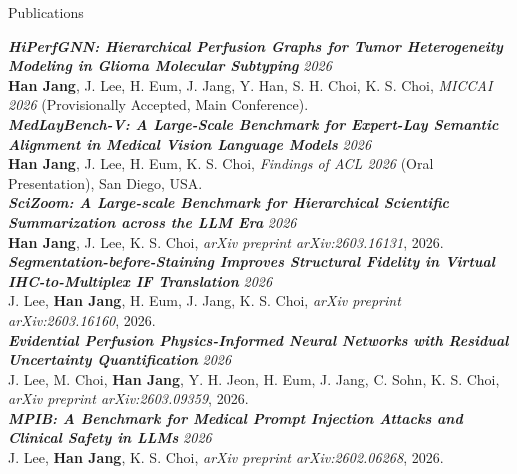 \documentclass{resume}
\begin{document}
\begin{rSection}{Publications}

\textbf{\textit{HiPerfGNN: Hierarchical Perfusion Graphs for Tumor Heterogeneity Modeling in Glioma Molecular Subtyping}}%
\hfill \textit{2026} \\
\hspace*{1em} \textbf{Han Jang}, J. Lee, H. Eum, J. Jang, Y. Han, S. H. Choi, K. S. Choi, \textit{MICCAI 2026} (Provisionally Accepted, Main Conference).
\\[0.8em]

\textbf{\textit{MedLayBench-V: A Large-Scale Benchmark for Expert-Lay Semantic Alignment in Medical Vision Language Models}}%
\hfill \textit{2026} \\
\hspace*{1em} \textbf{Han Jang}, J. Lee, H. Eum, K. S. Choi, \textit{Findings of ACL 2026} (Oral Presentation), San Diego, USA.
\\[0.8em]

\textbf{\textit{SciZoom: A Large-scale Benchmark for Hierarchical Scientific Summarization across the LLM Era}}%
\hfill \textit{2026} \\
\hspace*{1em} \textbf{Han Jang}, J. Lee, K. S. Choi, \textit{arXiv preprint arXiv:2603.16131}, 2026.
\\[0.8em]

\textbf{\textit{Segmentation-before-Staining Improves Structural Fidelity in Virtual IHC-to-Multiplex IF Translation}}%
\hfill \textit{2026} \\
\hspace*{1em} J. Lee, \textbf{Han Jang}, H. Eum, J. Jang, K. S. Choi, \textit{arXiv preprint arXiv:2603.16160}, 2026.
\\[0.8em]

\textbf{\textit{Evidential Perfusion Physics-Informed Neural Networks with Residual Uncertainty Quantification}}%
\hfill \textit{2026} \\
\hspace*{1em} J. Lee, M. Choi, \textbf{Han Jang}, Y. H. Jeon, H. Eum, J. Jang, C. Sohn, K. S. Choi, \textit{arXiv preprint arXiv:2603.09359}, 2026.
\\[0.8em]

\textbf{\textit{MPIB: A Benchmark for Medical Prompt Injection Attacks and Clinical Safety in LLMs}}%
\hfill \textit{2026} \\
\hspace*{1em} J. Lee, \textbf{Han Jang}, K. S. Choi, \textit{arXiv preprint arXiv:2602.06268}, 2026.
\\[0.8em]


\end{rSection}
\end{document}
